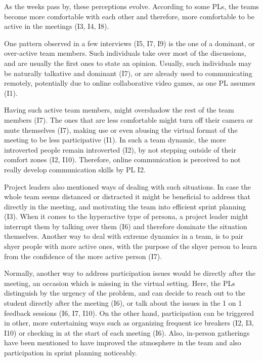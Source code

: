 As the weeks pass by, these perceptions evolve. According to some PLs, the teams become more comfortable with each other and therefore, more comfortable to be active in the meetings (I3, I4, I8). 

One pattern observed in a few interviews (I5, I7, I9) is the one of a dominant, or over-active team members. Such individuals take over most of the discussions, and are usually the first ones to state an opinion. Usually, such individuals may be naturally talkative and dominant (I7), or are already used to communicating remotely, potentially due to online collaborative video games, as one PL assumes (I1). 

Having such active team members, might overshadow the rest of the team members (I7). The ones that are less comfortable might turn off their camera or mute themselves (I7), making use or even abusing the virtual format of the meeting to be less participative (I1). In such a team dynamic, the more introverted people remain introverted (I2), by not stepping outside of their comfort zones (I2, I10). Therefore, online communication is perceived to not really develop communication skills by PL I2.

Project leaders also mentioned ways of dealing with such situations. In case the whole team seems distanced or distracted it might be beneficial to address that directly in the meeting, and motivating the team into efficient sprint planning (I3). When it comes to the hyperactive type of persona, a project leader might interrupt them by talking over them (I6) and therefore dominate the situation themselves. Another way to deal with extreme dynamics in a team, is to pair shyer people with more active ones, with the purpose of the shyer person to learn from the confidence of the more active person (I7). 

Normally, another way to address participation issues would be directly after the meeting, an occasion which is missing in the virtual setting. Here, the PLs distinguish by the urgency of the problem, and can decide to reach out to the student directly after the meeting (I6), or talk about the issues in the 1 on 1 feedback sessions (I6, I7, I10). On the other hand, participation can be triggered in other, more entertaining ways such as organizing frequent ice breakers (I2, I3, I10) or checking in at the start of each meeting (I6). Also, in-person gatherings have been mentioned to have improved the atmosphere in the team and also participation in sprint planning noticeably. 


